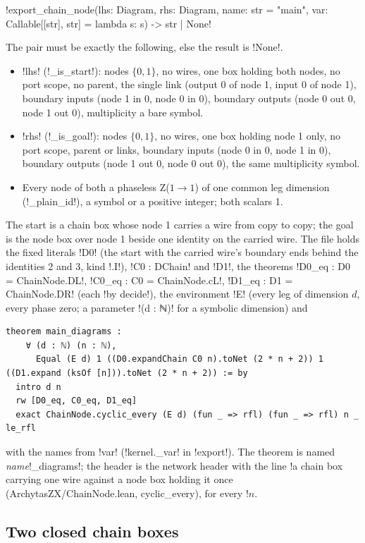 {\begin{signature}
\py!export_chain_node(lhs: Diagram, rhs: Diagram, name: str = "main", var: Callable[[str], str] = lambda s: s) -> str | None!
\end{signature}
\noindent The pair must be exactly the following, else the result is \py!None!.
\begin{itemize}
\item \py!lhs! (\py!_is_start!): nodes $\{0, 1\}$, no wires, one box holding both nodes, no port
  scope, no parent, the single link (output 0 of node 1, input 0 of node 1), boundary inputs
  (node 1 in 0, node 0 in 0), boundary outputs (node 0 out 0, node 1 out 0), multiplicity a bare
  symbol.
\item \py!rhs! (\py!_is_goal!): nodes $\{0, 1\}$, no wires, one box holding node 1 only, no port
  scope, parent or links, boundary inputs (node 0 in 0, node 1 in 0), boundary outputs (node 1
  out 0, node 0 out 0), the same multiplicity symbol.
\item Every node of both a phaseless Z($1\to1$) of one common leg dimension (\py!_plain_id!), a
  symbol or a positive integer; both scalars 1.
\end{itemize}
The start is a chain box whose node 1 carries a wire from copy to copy; the goal is the node box
over node 1 beside one identity on the carried wire. The file holds the fixed literals
\code!D0! (the start with the carried wire's boundary ends behind the identities 2 and 3, kind
\lean!.I!), \code!C0 : DChain! and \code!D1!, the theorems \code!D0_eq : D0 = ChainNode.DL!,
\code!C0_eq : C0 = ChainNode.cL!, \code!D1_eq : D1 = ChainNode.DR! (each \code!by decide!), the
environment \code!E! (every leg of dimension $d$, every phase zero; a parameter
\code!(d : ℕ)! for a symbolic dimension) and
\begin{lstlisting}[style=leannet]
theorem main_diagrams :
    ∀ (d : ℕ) (n : ℕ),
      Equal (E d) 1 ((D0.expandChain C0 n).toNet (2 * n + 2)) 1 ((D1.expand (ksOf [n])).toNet (2 * n + 2)) := by
  intro d n
  rw [D0_eq, C0_eq, D1_eq]
  exact ChainNode.cyclic_every (E d) (fun _ => rfl) (fun _ => rfl) n _ le_rfl
\end{lstlisting}
with the names from \py!var! (\py!kernel._var! in \py!export!). The theorem is named
\textit{name}\code!_diagrams!; the header is the network header with the line
\code!a chain box carrying one wire against a node box holding it once (ArchytasZX/ChainNode.lean, cyclic_every), for every !$n$.

\subsection{Two closed chain boxes}\label{sec:lean-export-net-chainfam}

}
